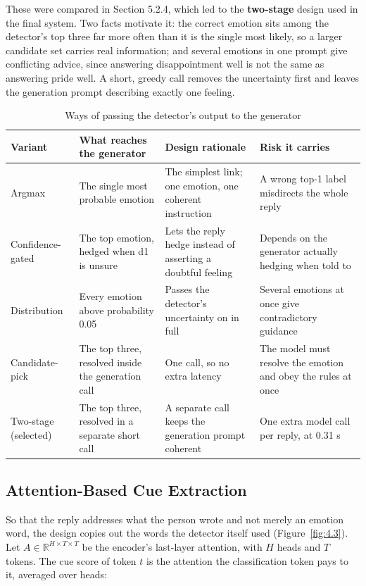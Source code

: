 These were compared in Section 5.2.4, which led to the\textbf{ two-stage} design used in the final system. Two facts motivate it: the correct emotion sits among the detector's top three far more often than it is the single most likely, so a larger candidate set carries real information; and several emotions in one prompt give conflicting advice, since answering disappointment well is not the same as answering pride well. A short, greedy call removes the uncertainty first and leaves the generation prompt describing exactly one feeling.

\begin{table}[H]
\centering
\footnotesize
\begin{tabularx}{\textwidth}{@{}lXXX@{}}
\toprule
\textbf{Variant} & \textbf{What reaches the generator} & \textbf{Design rationale} & \textbf{Risk it carries} \\
\midrule
Argmax & The single most probable emotion & The simplest link; one emotion, one coherent instruction & A wrong top-1 label misdirects the whole reply \\
Confidence-gated & The top emotion, hedged when d1 is unsure & Lets the reply hedge instead of asserting a doubtful feeling & Depends on the generator actually hedging when told to \\
Distribution & Every emotion above probability 0.05 & Passes the detector's uncertainty on in full & Several emotions at once give contradictory guidance \\
Candidate-pick & The top three, resolved inside the generation call & One call, so no extra latency & The model must resolve the emotion and obey the rules at once \\
Two-stage (selected) & The top three, resolved in a separate short call & A separate call keeps the generation prompt coherent & One extra model call per reply, at 0.31 s \\
\bottomrule
\end{tabularx}
\caption{Ways of passing the detector's output to the generator}
\label{tab:4.4}
\end{table}

\subsection{Attention-Based Cue Extraction}

So that the reply addresses what the person wrote and not merely an emotion word, the design copies out the words the detector itself used (Figure~\ref{fig:4.3}). Let \(A \in \mathbb{R}^{H \times T \times T}\) be the encoder's last-layer attention, with \(H\) heads and \(T\) tokens. The cue score of token \(t\) is the attention the classification token pays to it, averaged over heads:

